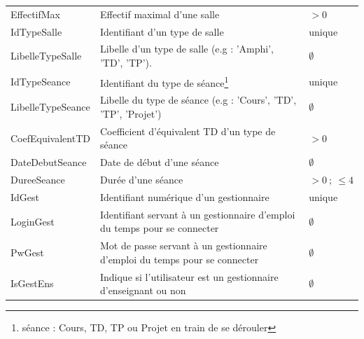 \documentclass{article}
\begin{document}
\begin{tabular}{|p{4cm}|p{8cm}|p{5cm}|}
  EffectifMax & Effectif maximal d'une salle & $> 0$ \\

  IdTypeSalle & Identifiant d'un type de salle & unique \\

  LibelleTypeSalle & Libelle d'un type de salle (e.g : 'Amphi', 'TD', 'TP'). & $\emptyset$ \\

  IdTypeSeance & Identifiant du type de séance\footnote{séance : Cours, TD, TP ou Projet en train de se dérouler} & unique \\

  LibelleTypeSeance & Libelle du type de séance (e.g : 'Cours', 'TD', 'TP', 'Projet') & $\emptyset$ \\

  CoefEquivalentTD & Coefficient d'équivalent TD d'un type de séance & $> 0$ \\

  DateDebutSeance & Date de début d'une séance & $\emptyset$ \\

  DureeSeance & Durée d'une séance & $> 0\ ;\ \leq 4$ \\

  IdGest & Identifiant numérique d'un gestionnaire & unique \\

  LoginGest & Identifiant servant à un gestionnaire d'emploi du temps pour se connecter & $\emptyset$ \\

  PwGest & Mot de passe servant à un gestionnaire d'emploi du temps pour se connecter & $\emptyset$ \\

  IsGestEns & Indique si l'utilisateur est un gestionnaire d'enseignant ou non & $\emptyset$ \\

  \hline
\end{tabular}

\newpage
\end{document}
